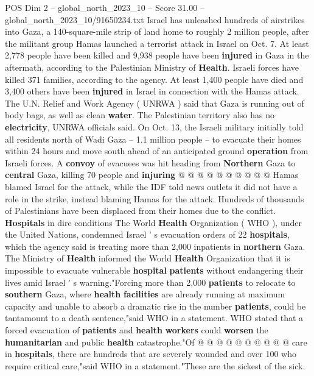\begin{textsample}{POS Dim 2 – global\_north\_2023\_10 – Score 31.00 – global\_north\_2023\_10/91650234.txt}  \label{ex:f2_pos_285}
Israel has unleashed hundreds of airstrikes into Gaza, a 140-square-mile strip of land home to roughly 2 million people, after the militant group Hamas launched a terrorist attack in Israel on Oct. 7.
At least 2,778 people have been killed and 9,938 people have been \textbf{injured} in Gaza in the aftermath, according to the Palestinian Ministry of \textbf{Health}.
Israeli forces have killed 371 families, according to the agency.
At least 1,400 people have died and 3,400 others have been \textbf{injured} in Israel in connection with the Hamas attack.
The U.N.
Relief and Work Agency ( UNRWA ) said that Gaza is running out of body bags, as well as clean \textbf{water}.
The Palestinian territory also has no \textbf{electricity}, UNRWA officials said.
On Oct. 13, the Israeli military initially told all residents north of Wadi Gaza -- 1.1 million people -- to evacuate their homes within 24 hours and move south ahead of an anticipated ground \textbf{operation} from Israeli forces.
A \textbf{convoy} of evacuees was hit heading from \textbf{Northern} Gaza to \textbf{central} Gaza, killing 70 people and \textbf{injuring} @ @ @ @ @ @ @ @ @ @ Hamas blamed Israel for the attack, while the IDF told news outlets it did not have a role in the strike, instead blaming Hamas for the attack.
Hundreds of thousands of Palestinians have been displaced from their homes due to the conflict. \textbf{Hospitals} in dire conditions The World \textbf{Health} Organization ( WHO ), under the United Nations, condemned Israel ' s evacuation orders of 22 \textbf{hospitals}, which the agency said is treating more than 2,000 inpatients in \textbf{northern} Gaza.
The Ministry of \textbf{Health} informed the World \textbf{Health} Organization that it is impossible to evacuate vulnerable \textbf{hospital} \textbf{patients} without endangering their lives amid Israel ' s warning."Forcing more than 2,000 \textbf{patients} to relocate to \textbf{southern} Gaza, where \textbf{health} \textbf{facilities} are already running at maximum capacity and unable to absorb a dramatic rise in the number \textbf{patients}, could be tantamount to a death sentence,"said WHO in a statement.
WHO stated that a forced evacuation of \textbf{patients} and \textbf{health} \textbf{workers} could \textbf{worsen} the \textbf{humanitarian} and public \textbf{health} catastrophe."Of @ @ @ @ @ @ @ @ @ @ care in \textbf{hospitals}, there are hundreds that are severely wounded and over 100 who require critical care,"said WHO in a statement."These are the sickest of the sick.

\end{textsample}
